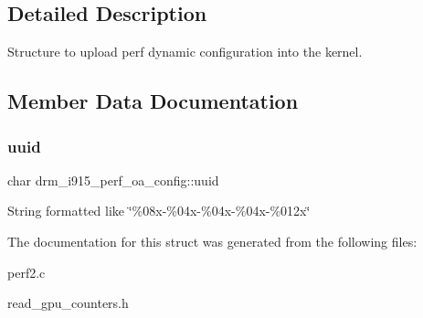 \subsection{Detailed Description}
Structure to upload perf dynamic configuration into the kernel. 

\subsection{Member Data Documentation}
\mbox{\label{structdrm__i915__perf__oa__config_a2b0d98bfda89545391b587c92edb7a93}} 
\subsubsection{\texorpdfstring{uuid}{uuid}}
{\footnotesize\ttfamily char drm\+\_\+i915\+\_\+perf\+\_\+oa\+\_\+config\+::uuid}

String formatted like \char`\"{}\%08x-\/\%04x-\/\%04x-\/\%04x-\/\%012x\char`\"{} 

The documentation for this struct was generated from the following files\+:\begin{DoxyCompactItemize}
\item 
perf2.\+c\item 
read\+\_\+gpu\+\_\+counters.\+h\end{DoxyCompactItemize}
